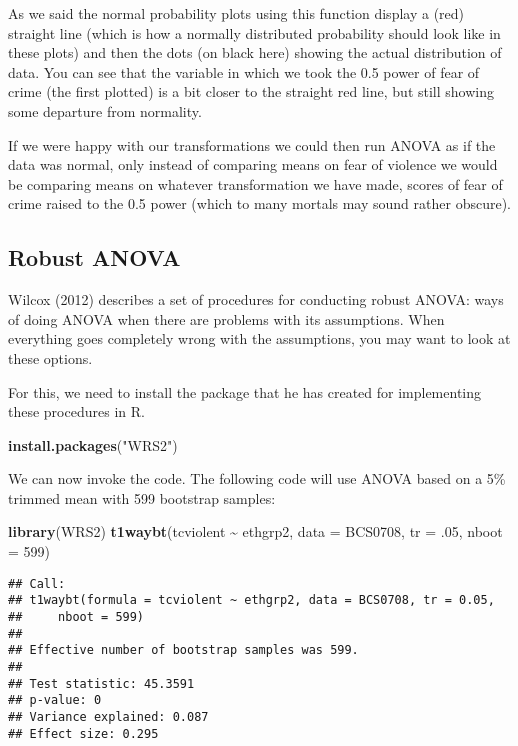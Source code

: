 \documentclass[
]{book}
\newenvironment{Shaded}{\begin{snugshade}}{\end{snugshade}}
\newcommand{\AttributeTok}[1]{\textcolor[rgb]{0.13,0.29,0.53}{#1}}
\newcommand{\DecValTok}[1]{\textcolor[rgb]{0.00,0.00,0.81}{#1}}
\newcommand{\FunctionTok}[1]{\textcolor[rgb]{0.13,0.29,0.53}{\textbf{#1}}}
\newcommand{\NormalTok}[1]{#1}
\newcommand{\SpecialCharTok}[1]{\textcolor[rgb]{0.81,0.36,0.00}{\textbf{#1}}}
\newcommand{\StringTok}[1]{\textcolor[rgb]{0.31,0.60,0.02}{#1}}
\begin{document}
As we said the normal probability plots using this function display a (red) straight line (which is how a normally distributed probability should look like in these plots) and then the dots (on black here) showing the actual distribution of data. You can see that the variable in which we took the 0.5 power of fear of crime (the first plotted) is a bit closer to the straight red line, but still showing some departure from normality.

If we were happy with our transformations we could then run ANOVA as if the data was normal, only instead of comparing means on fear of violence we would be comparing means on whatever transformation we have made, scores of fear of crime raised to the 0.5 power (which to many mortals may sound rather obscure).

\subsection{Robust ANOVA}\label{robust-anova}

Wilcox (2012) describes a set of procedures for conducting robust ANOVA: ways of doing ANOVA when there are problems with its assumptions. When everything goes completely wrong with the assumptions, you may want to look at these options.

For this, we need to install the package that he has created for implementing these procedures in R.

\begin{Shaded}
\begin{Highlighting}[]
\FunctionTok{install.packages}\NormalTok{(}\StringTok{"WRS2"}\NormalTok{)}
\end{Highlighting}
\end{Shaded}

We can now invoke the code. The following code will use ANOVA based on a 5\% trimmed mean with 599 bootstrap samples:

\begin{Shaded}
\begin{Highlighting}[]
\FunctionTok{library}\NormalTok{(WRS2)}
\FunctionTok{t1waybt}\NormalTok{(tcviolent }\SpecialCharTok{\textasciitilde{}}\NormalTok{ ethgrp2, }\AttributeTok{data =}\NormalTok{ BCS0708, }\AttributeTok{tr =}\NormalTok{ .}\DecValTok{05}\NormalTok{, }\AttributeTok{nboot =} \DecValTok{599}\NormalTok{)}
\end{Highlighting}
\end{Shaded}

\begin{verbatim}
## Call:
## t1waybt(formula = tcviolent ~ ethgrp2, data = BCS0708, tr = 0.05, 
##     nboot = 599)
## 
## Effective number of bootstrap samples was 599.
## 
## Test statistic: 45.3591 
## p-value: 0 
## Variance explained: 0.087 
## Effect size: 0.295
\end{verbatim}
\end{document}
